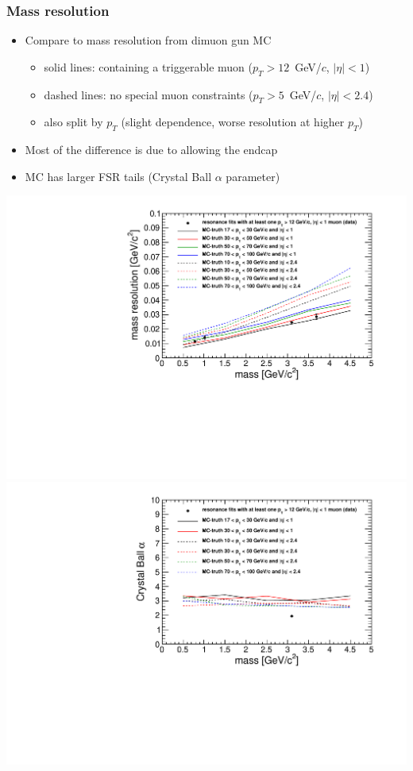 \documentclass[compress]{beamer}
\begin{document}
\begin{frame}
\frametitle{Mass resolution}

\begin{itemize}
\item Compare to mass resolution from dimuon gun MC
\begin{itemize}
\item \scriptsize solid lines: containing a triggerable muon ($p_T > 12$~GeV/$c$, $|\eta| < 1$)
\item \scriptsize dashed lines: no special muon constraints ($p_T > 5$~GeV/$c$, $|\eta| < 2.4$)
\item \scriptsize also split by $p_T$ (slight dependence, worse resolution at higher $p_T$)
\end{itemize}

\item Most of the difference is due to allowing the endcap

\item MC has larger FSR tails (Crystal Ball $\alpha$ parameter)
\end{itemize}

\vfill
\includegraphics[width=0.5\linewidth]{resolution.pdf}
\includegraphics[width=0.5\linewidth]{resolution_alpha.pdf}
\end{frame}
\end{document}
